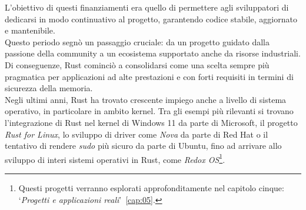 L'obiettivo di questi finanziamenti era quello di permettere agli sviluppatori di dedicarsi in modo continuativo al progetto, garantendo
codice stabile, aggiornato e mantenibile. \hfill
\vspace{10pt}\\
\noindent Questo periodo segnò un passaggio cruciale: da un progetto guidato dalla passione della community a un ecosistema supportato anche
da risorse industriali. Di conseguenze, Rust cominciò a consolidarsi come una scelta sempre più pragmatica per applicazioni 
ad alte prestazioni e con forti requisiti in termini di sicurezza della memoria. \hfill
\vspace{15pt}\\
\noindent Negli ultimi anni, Rust ha trovato crescente impiego anche a livello di sistema operativo, in particolare in ambito kernel.
Tra gli esempi più rilevanti si trovano l'integrazione di Rust nel kernel di Windows 11 da parte di Microsoft,
il progetto \textit{Rust for Linux}, lo sviluppo di driver come \textit{Nova} da parte di Red Hat o il tentativo di rendere
\textit{sudo} più sicuro da parte di Ubuntu, fino ad arrivare allo sviluppo di interi sistemi operativi in Rust, come \textit{Redox OS}\footnote{Questi progetti verranno esplorati approfonditamente nel capitolo cinque: `\textit{Progetti e applicazioni reali}'~\ref{cap:05}.}.